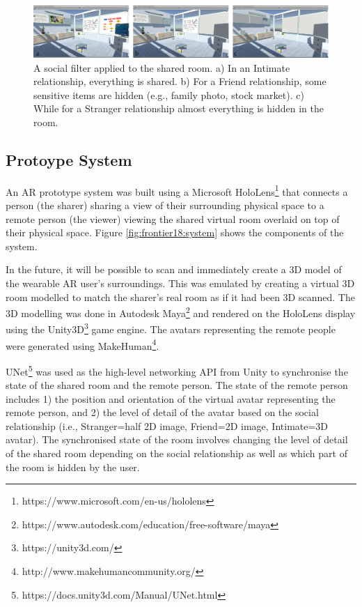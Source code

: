 \begin{figure}
\begin{center}
\includegraphics[width=\linewidth]{images/frontier18/images-02.png}
\caption{A social filter applied to the shared room. a) In an Intimate relationship, everything is shared. b) For a Friend relationship, some sensitive items are hidden (e.g., family photo, stock market). c) While for a Stranger relationship almost everything is hidden in the room.}\label{fig:frontier18:social-filter}
\end{center}
\end{figure}

\subsection{Protoype System}

An AR prototype system was built using a Microsoft HoloLens\footnote{https://www.microsoft.com/en-us/hololens} that connects a person (the sharer) sharing a view of their surrounding physical space to a remote person (the viewer) viewing the shared virtual room overlaid on top of their physical space. Figure \ref{fig:frontier18:system} shows the components of the system.

In the future, it will be possible to scan and immediately create a 3D model of the wearable AR user's surroundings. This was emulated by creating a virtual 3D room modelled to match the sharer's real room as if it had been 3D scanned.  The 3D modelling was done in Autodesk Maya\footnote{https://www.autodesk.com/education/free-software/maya} and rendered on the HoloLens display using the Unity3D\footnote{https://unity3d.com/} game engine. The avatars representing the remote people were generated using MakeHuman\footnote{http://www.makehumancommunity.org/}.

UNet\footnote{https://docs.unity3d.com/Manual/UNet.html} was used as the high-level networking API from Unity to synchronise the state of the shared room and the remote person. The state of the remote person includes 1) the position and orientation of the virtual avatar representing the remote person, and 2) the level of detail of the avatar based on the social relationship (i.e., Stranger=half 2D image, Friend=2D image, Intimate=3D avatar). The synchronised state of the room involves changing the level of detail of the shared room depending on the social relationship as well as which part of the room is hidden by the user. 

